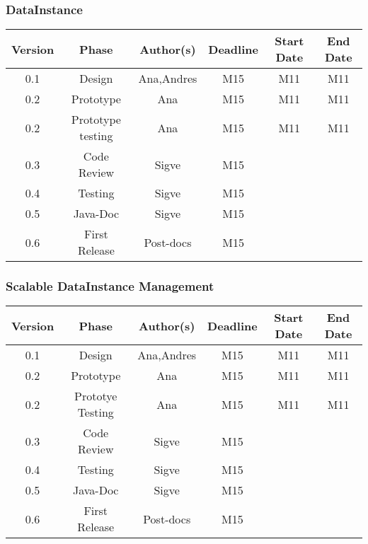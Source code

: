 \subsubsection*{DataInstance}


\begin{table}[H]
\begin{tabular}{cccccc}
\hline
\textbf{Version} & \textbf{Phase} & \textbf{Author(s)} & \textbf{Deadline} & \textbf{Start Date} & \textbf{End Date}\\
\hline
0.1 & Design & Ana,Andres & M15 & M11 & M11\\
\hline 
0.2 & Prototype & Ana & M15 & M11 & M11\\
\hline 
0.2 & Prototype testing & Ana & M15 & M11 & M11\\
\hline 
0.3 & Code Review & Sigve & M15 &  & \\
\hline 
0.4 & Testing & Sigve & M15 & & \\
\hline 
0.5 & Java-Doc  & Sigve & M15 &  & \\
\hline 
0.6 & First Release & Post-docs & M15 &  & \\
\hline
\end{tabular}
\end{table}

\subsubsection*{Scalable DataInstance Management}

\begin{table}[H]
\begin{tabular}{cccccc}
\hline
\textbf{Version} & \textbf{Phase} & \textbf{Author(s)} & \textbf{Deadline} & \textbf{Start Date} & \textbf{End Date}\\
\hline
0.1 & Design & Ana,Andres & M15 & M11 & M11\\
\hline 
0.2 & Prototype & Ana & M15 & M11 & M11\\
\hline 
0.2& Prototye Testing & Ana & M15 & M11 & M11\\
\hline 
0.3 & Code Review & Sigve & M15 &  & \\
\hline 
0.4 & Testing & Sigve & M15 &  & \\
\hline 
0.5 & Java-Doc  & Sigve & M15 &  & \\
\hline 
0.6 & First Release & Post-docs & M15 &  & \\
\hline
\end{tabular}
\end{table}